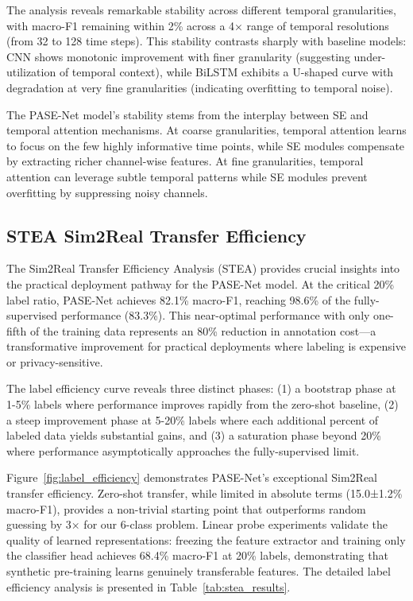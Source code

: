 \documentclass[journal]{IEEEtran}
\begin{document}
The analysis reveals remarkable stability across different temporal granularities, with macro-F1 remaining within 2\% across a 4× range of temporal resolutions (from 32 to 128 time steps). This stability contrasts sharply with baseline models: CNN shows monotonic improvement with finer granularity (suggesting under-utilization of temporal context), while BiLSTM exhibits a U-shaped curve with degradation at very fine granularities (indicating overfitting to temporal noise).

The PASE-Net model's stability stems from the interplay between SE and temporal attention mechanisms. At coarse granularities, temporal attention learns to focus on the few highly informative time points, while SE modules compensate by extracting richer channel-wise features. At fine granularities, temporal attention can leverage subtle temporal patterns while SE modules prevent overfitting by suppressing noisy channels.

\subsection{STEA Sim2Real Transfer Efficiency}

The Sim2Real Transfer Efficiency Analysis (STEA) provides crucial insights into the practical deployment pathway for the PASE-Net model. At the critical 20\% label ratio, PASE-Net achieves 82.1\% macro-F1, reaching 98.6\% of the fully-supervised performance (83.3\%). This near-optimal performance with only one-fifth of the training data represents an 80\% reduction in annotation cost—a transformative improvement for practical deployments where labeling is expensive or privacy-sensitive.

The label efficiency curve reveals three distinct phases: (1) a bootstrap phase at 1-5\% labels where performance improves rapidly from the zero-shot baseline, (2) a steep improvement phase at 5-20\% labels where each additional percent of labeled data yields substantial gains, and (3) a saturation phase beyond 20\% where performance asymptotically approaches the fully-supervised limit.

Figure~\ref{fig:label_efficiency} demonstrates PASE-Net's exceptional Sim2Real transfer efficiency. Zero-shot transfer, while limited in absolute terms (15.0±1.2\% macro-F1), provides a non-trivial starting point that outperforms random guessing by 3× for our 6-class problem. Linear probe experiments validate the quality of learned representations: freezing the feature extractor and training only the classifier head achieves 68.4\% macro-F1 at 20\% labels, demonstrating that synthetic pre-training learns genuinely transferable features. The detailed label efficiency analysis is presented in Table~\ref{tab:stea_results}.
\end{document}
